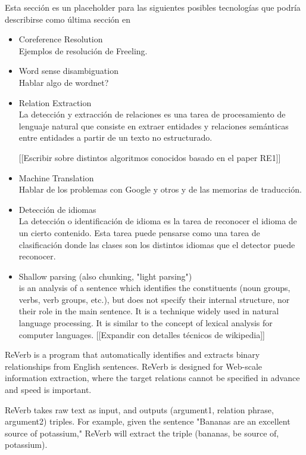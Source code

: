 Esta sección es un placeholder para las siguientes posibles tecnologías que podría describirse como última sección en 
\begin{itemize}
  \item Coreference Resolution \\
  Ejemplos de resolución de Freeling.
  \item Word sense disambiguation \\
  Hablar algo de wordnet?
  \item Relation Extraction \\
  La detección y extracción de relaciones es una tarea de procesamiento
de lenguaje natural que consiste en extraer entidades y relaciones semánticas
entre entidades a partir de un texto no estructurado. 

[[Escribir sobre distintos algoritmos conocidos basado en el paper RE1]]
  \item Machine Translation \\
    Hablar de los problemas con Google y otros y de las memorias de traducción. 
  \item Detección de idiomas \\
  La detección o identificación de idioma es la tarea de reconocer el
idioma de un cierto contenido. Esta tarea puede pensarse como una
tarea de clasificación donde las clases son los distintos
idiomas que el detector puede reconocer. 
  \item Shallow parsing (also chunking, "light parsing") \\
  is an analysis of a sentence which identifies the constituents (noun groups, verbs, verb groups, etc.), but does not specify their internal structure, nor their role in the main sentence.
It is a technique widely used in natural language processing. It is similar to the concept of lexical analysis for computer languages.
[[Expandir con detalles técnicos de wikipedia]]
\end{itemize}

ReVerb is a program that automatically identifies and extracts binary relationships from English sentences. ReVerb is designed for Web-scale information extraction, where the target relations cannot be specified in advance and speed is important.

ReVerb takes raw text as input, and outputs (argument1, relation phrase, argument2) triples. For example, given the sentence "Bananas are an excellent source of potassium," ReVerb will extract the triple (bananas, be source of, potassium).
